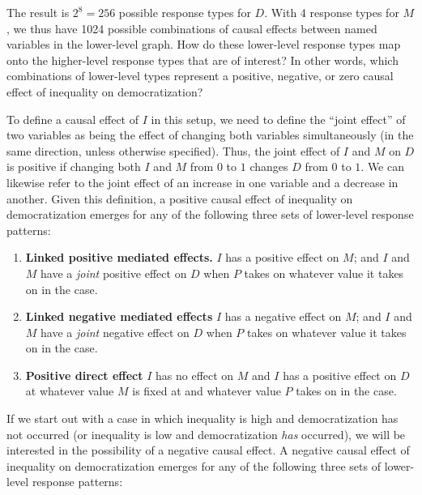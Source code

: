 \documentclass[
  12pt,
]{book}
\begin{document}
The result is \(2^8=256\) possible response types for \(D\). With 4 response types for \(M\), we thus have 1024 possible combinations of causal effects between named variables in the lower-level graph. How do these lower-level response types map onto the higher-level response types that are of interest? In other words, which combinations of lower-level types represent a positive, negative, or zero causal effect of inequality on democratization?

To define a causal effect of \(I\) in this setup, we need to define the ``joint effect'' of two variables as being the effect of changing both variables simultaneously (in the same direction, unless otherwise specified). Thus, the joint effect of \(I\) and \(M\) on \(D\) is positive if changing both \(I\) and \(M\) from \(0\) to \(1\) changes \(D\) from \(0\) to \(1\). We can likewise refer to the joint effect of an increase in one variable and a decrease in another. Given this definition, a positive causal effect of inequality on democratization emerges for any of the following three sets of lower-level response patterns:

\begin{enumerate}
\def\labelenumi{\arabic{enumi}.}
\item
  \textbf{Linked positive mediated effects.} \(I\) has a positive effect on \(M\); and \(I\) and \(M\) have a \emph{joint} positive effect on \(D\) when \(P\) takes on whatever value it takes on in the case.
\item
  \textbf{Linked negative mediated effects} \(I\) has a negative effect on \(M\); and \(I\) and \(M\) have a \emph{joint} negative effect on \(D\) when \(P\) takes on whatever value it takes on in the case.
\item
  \textbf{Positive direct effect} \(I\) has no effect on \(M\) and \(I\) has a positive effect on \(D\) at whatever value \(M\) is fixed at and whatever value \(P\) takes on in the case.
\end{enumerate}

If we start out with a case in which inequality is high and democratization has not occurred (or inequality is low and democratization \emph{has} occurred), we will be interested in the possibility of a negative causal effect. A negative causal effect of inequality on democratization emerges for any of the following three sets of lower-level response patterns:
\end{document}
